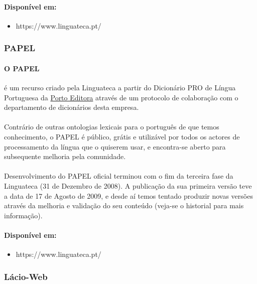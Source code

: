 \documentclass[a4paper, 10pt]{article}
\begin{document}
            	\paragraph{Disponível em:}
            	\begin{itemize}
				    \item https://www.linguateca.pt/

			    \end{itemize}
            \subsubsection{PAPEL}
            	\paragraph{O PAPEL}
            	é um recurso criado pela Linguateca a partir do Dicionário PRO de Língua Portuguesa da \href{http://www.portoeditora.pt/}{Porto Editora} através de um protocolo de colaboração com o departamento de dicionários desta empresa.
				\paragraph{}
				Contrário de outras ontologias lexicais para o português de que temos conhecimento, o PAPEL é público, grátis e utilizável por todos os actores de processamento da língua que o quiserem usar, e encontra-se aberto para subsequente melhoria pela comunidade.
				\paragraph{} 
				Desenvolvimento do PAPEL oficial terminou com o fim da terceira fase da Linguateca (31 de Dezembro de 2008). A publicação da sua primeira versão teve a data de 17 de Agosto de 2009, e desde aí temos tentado produzir novas versões através da melhoria e validação do seu conteúdo (veja-se o historial para mais informação).
				\paragraph{Disponível em:}
            	\begin{itemize}
				    \item https://www.linguateca.pt/

			    \end{itemize}

            \subsubsection{Lácio-Web}
\end{document}
